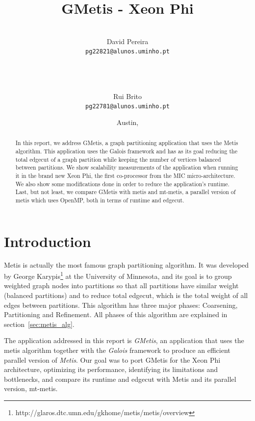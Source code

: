 \documentclass[abstract=on,9pt,twocolumn]{scrartcl}
\title{GMetis - Xeon Phi}
\author{
    \\David Pereira\\
     	\texttt{\smaller pg22821@alunos.uminho.pt}
\\~\\~
\and\\Rui Brito\\
	\texttt{\smaller pg22781@alunos.uminho.pt}
}
\date{Austin, \docdate}
\begin{document}
\maketitle	



\begin{abstract}
In this report, we address GMetis, a graph partitioning application that
uses the Metis algorithm. This application uses the Galois framework
and has as its goal reducing the total edgecut of a graph partition while keeping
the number of vertices balanced between partitions. We show scalability measurements of the
application when running it in the brand new Xeon Phi, the first
co-processor from the MIC micro-architecture. We also show some modifications
done in order to reduce the application's runtime. Last, but not least, we compare
GMetis with metis and mt-metis, a parallel version of metis which uses
OpenMP, both in terms of runtime and edgecut.
\end{abstract}



\section{Introduction}
Metis is actually the most famous graph partitioning algorithm. It was
developed by George Karypis\footnote{http://glaros.dtc.umn.edu/gkhome/metis/metis/overview}
at the University of Minnesota, and its goal is to group
weighted graph nodes into partitions so that all partitions have similar
weight (balanced partitions) and to reduce total edgecut, which is the
total weight of all edges between partitions. This algorithm has three
major phases: Coarsening, Partitioning  and Refinement.
All phases of this algorithm are explained in
section~\ref{sec:metis_alg}.

The application addressed in this report is \textit{GMetis}, an
application that uses the metis algorithm together with the
\textit{Galois} framework to produce an efficient parallel version of
\textit{Metis}. Our goal was to port GMetis for the Xeon Phi
architecture, optimizing its performance, identifying its
limitations and bottlenecks, and compare its runtime and edgecut with
Metis and its parallel version, mt-metis.
\end{document}
